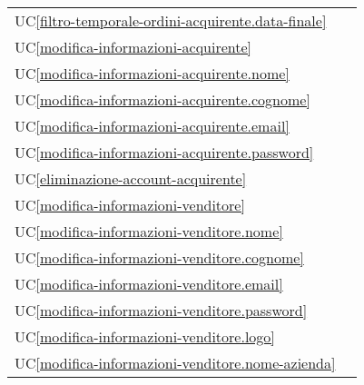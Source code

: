\begin{longtable}{C{6cm} C{6cm}}
    UC\ref{filtro-temporale-ordini-acquirente.data-finale} &  \\

	UC\ref{modifica-informazioni-acquirente} &  \\

    UC\ref{modifica-informazioni-acquirente.nome} &  \\

	UC\ref{modifica-informazioni-acquirente.cognome} &  \\

    UC\ref{modifica-informazioni-acquirente.email} &  \\

	UC\ref{modifica-informazioni-acquirente.password} &  \\

    UC\ref{eliminazione-account-acquirente} &  \\

	UC\ref{modifica-informazioni-venditore} &  \\

    UC\ref{modifica-informazioni-venditore.nome} &  \\

    UC\ref{modifica-informazioni-venditore.cognome} &  \\

	UC\ref{modifica-informazioni-venditore.email} &  \\

    UC\ref{modifica-informazioni-venditore.password} &  \\

	UC\ref{modifica-informazioni-venditore.logo} &  \\

    UC\ref{modifica-informazioni-venditore.nome-azienda} &  \\


\end{longtable}

